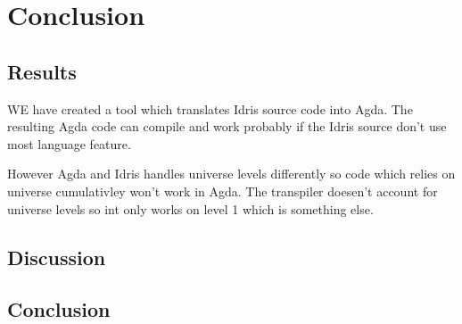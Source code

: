 \chapter{Conclusion}


\section{Results}

WE have created a tool which translates Idris source code into Agda. The
resulting Agda code can compile and work probably if the Idris source don't use
most language feature.

However Agda and Idris handles universe levels differently so code which relies
on universe cumulativley won't work in Agda. The transpiler doesen't account
for universe levels so int only works on level 1 which is something else.


\section{Discussion}



\section{Conclusion}

